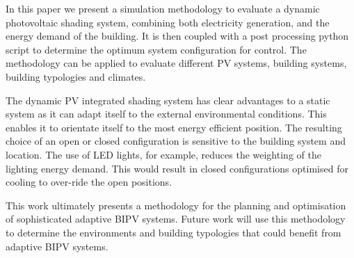 
In this paper we present a simulation methodology to evaluate a dynamic photovoltaic shading system, combining both electricity generation, and the energy demand of the building. It is then coupled with a post processing python script to determine the optimum system configuration for control. The methodology can be applied to evaluate different PV systems, building systems, building typologies and climates.

The dynamic PV integrated shading system has clear advantages to a static system as it can adapt itself to the external environmental conditions. This enables it to orientate itself to the most energy efficient position. The resulting choice of an open or closed configuration is sensitive to the building system and location. The use of LED lights, for example, reduces the weighting of the lighting energy demand. This would result in closed configurations optimised for cooling to over-ride the open positions. 

This work ultimately presents a methodology for the planning and optimisation of sophisticated adaptive BIPV systems. Future work will use this methodology to determine the environments and building typologies that could benefit from adaptive BIPV systems. 



